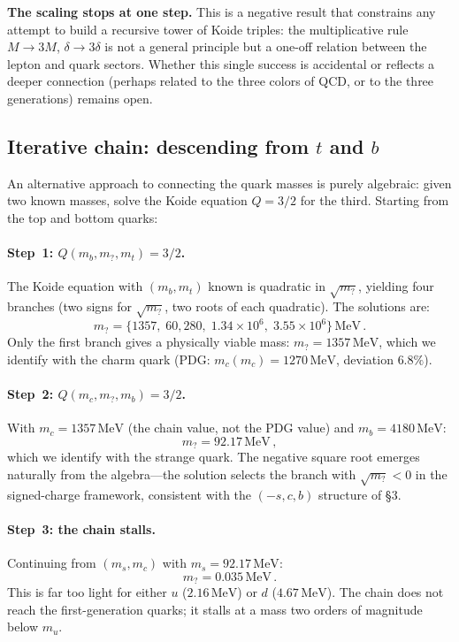 \documentclass[12pt,a4paper]{article}
\newcommand{\MeV}{\,\text{MeV}}
\begin{document}
\textbf{The scaling stops at one step.} This is a negative result
that constrains any attempt to build a recursive tower of Koide
triples: the multiplicative rule $M \to 3M$, $\delta \to 3\delta$
is not a general principle but a one-off relation between the lepton
and quark sectors. Whether this single success is accidental or
reflects a deeper connection (perhaps related to the three colors
of QCD, or to the three generations) remains open.

\subsection{Iterative chain: descending from $t$ and $b$}

An alternative approach to connecting the quark masses is purely
algebraic: given two known masses, solve the Koide equation
$Q = 3/2$ for the third. Starting from the top and bottom quarks:

\paragraph{Step~1: $Q(m_b, m_?, m_t) = 3/2$.}
The Koide equation with $(m_b, m_t)$ known is quadratic in
$\sqrt{m_?}$, yielding four branches (two signs for $\sqrt{m_?}$,
two roots of each quadratic). The solutions are:
\begin{equation}
m_? = \{1357,\; 60{,}280,\; 1.34 \times 10^6,\;
3.55 \times 10^6\}\MeV\,.
\end{equation}
Only the first branch gives a physically viable mass:
$m_? = 1357\MeV$, which we identify with the charm quark
(PDG: $m_c(m_c) = 1270\MeV$, deviation $6.8\%$).

\paragraph{Step~2: $Q(m_c, m_?, m_b) = 3/2$.}
With $m_c = 1357\MeV$ (the chain value, not the PDG value) and
$m_b = 4180\MeV$:
\begin{equation}
m_? = 92.17\MeV\,,
\end{equation}
which we identify with the strange quark. The negative square root
emerges naturally from the algebra---the solution selects the branch
with $\sqrt{m_?} < 0$ in the signed-charge framework, consistent
with the $(-s, c, b)$ structure of \S3.

\paragraph{Step~3: the chain stalls.}
Continuing from $(m_s, m_c)$ with $m_s = 92.17\MeV$:
\begin{equation}
m_? = 0.035\MeV\,.
\end{equation}
This is far too light for either $u$ ($2.16\MeV$) or $d$
($4.67\MeV$). The chain does not reach the first-generation quarks;
it stalls at a mass two orders of magnitude below $m_u$.
\end{document}
